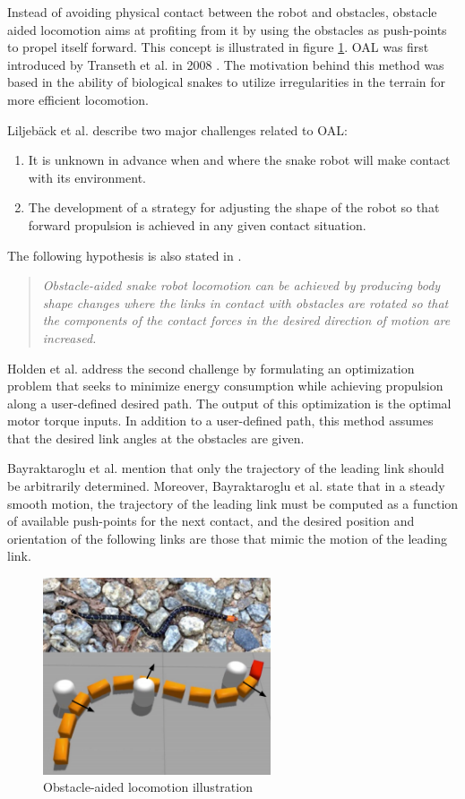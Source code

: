 Instead of avoiding physical contact between the robot and obstacles, obstacle aided locomotion aims at profiting from it by using the obstacles as push-points to propel itself forward. This concept is illustrated in figure \ref{fig:oal}. OAL was first introduced by Transeth et al. in 2008 \cite{transeth2008snake}. The motivation behind this method was based in the ability of biological snakes to utilize irregularities in the terrain for more efficient locomotion.

Liljebäck et al. \cite{liljeback2012snake} describe two major challenges related to OAL:
\begin{enumerate}
  \item It is unknown in advance when and where the snake robot will make contact with its environment.
  \item The development of a strategy for adjusting the shape of the robot so that forward propulsion is achieved in any given contact situation.
\end{enumerate}
The following hypothesis is also stated in \cite{liljeback2012snake}.
\begin{quote}
   \textit{ Obstacle-aided snake robot locomotion can be achieved by producing body shape changes where the links in contact with obstacles are rotated so that the components of the contact forces in the desired direction of motion are increased.}
\end{quote}

Holden et al. \cite{holden2014optimal} address the second challenge by formulating an optimization problem that seeks to minimize energy consumption while achieving propulsion along a user-defined desired path. The output of this optimization is the optimal motor torque inputs. In addition to a user-defined path, this method assumes that the desired link angles at the obstacles are given.

Bayraktaroglu et al. \cite{bayraktaroglu2004understanding} mention that only the trajectory of the leading link should be arbitrarily determined. Moreover, Bayraktaroglu et al. \cite{bayraktaroglu2004understanding} state that in a steady smooth motion, the trajectory of the leading link must be computed as a function of available push-points for the next contact, and the desired position and orientation of the following links are those that mimic the motion of the leading link.

\begin{figure}
    \centering
    \includegraphics[width=0.6\textwidth]{figures/theory/oal.PNG}
    \caption{Obstacle-aided locomotion illustration \cite{sanfilippo2017snakesim}}
    \label{fig:oal}
\end{figure}